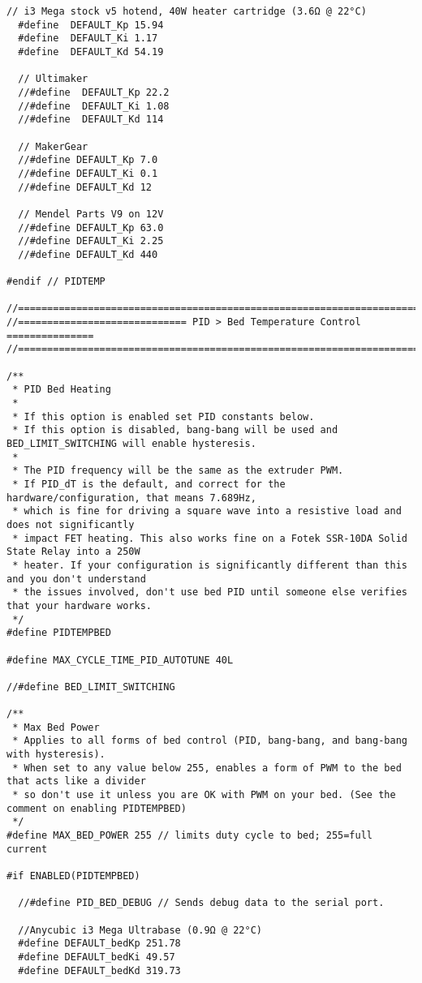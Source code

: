 \begin{lstlisting}[caption = キャプション, label = ラベル]
  // i3 Mega stock v5 hotend, 40W heater cartridge (3.6Ω @ 22°C)
  #define  DEFAULT_Kp 15.94
  #define  DEFAULT_Ki 1.17
  #define  DEFAULT_Kd 54.19

  // Ultimaker
  //#define  DEFAULT_Kp 22.2
  //#define  DEFAULT_Ki 1.08
  //#define  DEFAULT_Kd 114

  // MakerGear
  //#define DEFAULT_Kp 7.0
  //#define DEFAULT_Ki 0.1
  //#define DEFAULT_Kd 12

  // Mendel Parts V9 on 12V
  //#define DEFAULT_Kp 63.0
  //#define DEFAULT_Ki 2.25
  //#define DEFAULT_Kd 440

#endif // PIDTEMP

//===========================================================================
//============================= PID > Bed Temperature Control ===============
//===========================================================================

/**
 * PID Bed Heating
 *
 * If this option is enabled set PID constants below.
 * If this option is disabled, bang-bang will be used and BED_LIMIT_SWITCHING will enable hysteresis.
 *
 * The PID frequency will be the same as the extruder PWM.
 * If PID_dT is the default, and correct for the hardware/configuration, that means 7.689Hz,
 * which is fine for driving a square wave into a resistive load and does not significantly
 * impact FET heating. This also works fine on a Fotek SSR-10DA Solid State Relay into a 250W
 * heater. If your configuration is significantly different than this and you don't understand
 * the issues involved, don't use bed PID until someone else verifies that your hardware works.
 */
#define PIDTEMPBED

#define MAX_CYCLE_TIME_PID_AUTOTUNE 40L

//#define BED_LIMIT_SWITCHING

/**
 * Max Bed Power
 * Applies to all forms of bed control (PID, bang-bang, and bang-bang with hysteresis).
 * When set to any value below 255, enables a form of PWM to the bed that acts like a divider
 * so don't use it unless you are OK with PWM on your bed. (See the comment on enabling PIDTEMPBED)
 */
#define MAX_BED_POWER 255 // limits duty cycle to bed; 255=full current

#if ENABLED(PIDTEMPBED)

  //#define PID_BED_DEBUG // Sends debug data to the serial port.

  //Anycubic i3 Mega Ultrabase (0.9Ω @ 22°C)
  #define DEFAULT_bedKp 251.78
  #define DEFAULT_bedKi 49.57
  #define DEFAULT_bedKd 319.73


\end{lstlisting}
